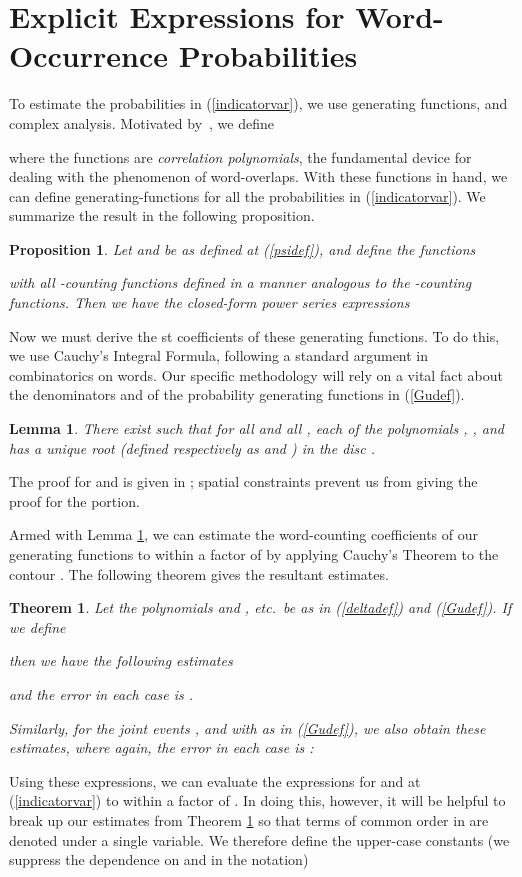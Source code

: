 \documentclass[proceedings]{aofa}
\newtheorem{theorem}{Theorem}
\newtheorem{lemma}{Lemma}
\newtheorem{proposition}{Proposition}
\begin{document}
\section{Explicit Expressions for Word-Occurrence Probabilities}\label{sec:Cauchy}
To estimate the probabilities in (\ref{indicatorvar}), we use
generating functions, 
and complex analysis.
Motivated by~\cite{Bassino:2012}, 
we define

where the functions  are \emph{correlation polynomials},
the fundamental device for dealing with the phenomenon of
word-overlaps. With these functions in hand, we can define
generating-functions 
for all the probabilities in (\ref{indicatorvar}). We summarize the result in the following proposition.
\begin{proposition}
Let  and  be as defined at (\ref{psidef}), and define the functions 

with all -counting functions defined in a manner analogous to the -counting functions. Then we have the closed-form power series expressions

\end{proposition}


Now we must derive the st coefficients of these generating
functions. To do this, we use Cauchy's Integral Formula, following a standard argument in combinatorics on words.  Our specific methodology will rely on a vital fact about the denominators  and  of the probability generating functions in (\ref{Gudef}).

\begin{lemma}\label{uniquerootlemma}
There exist  such that for all  and all , 
each of the polynomials , , and  has a unique root (defined respectively as  and ) in the disc .
\end{lemma}
The proof for  and  is given in \cite{Jacquet:2005}; spatial constraints prevent us from giving the proof for the  portion.

Armed with Lemma \ref{uniquerootlemma}, we can estimate the word-counting coefficients of our generating functions to within a factor of  by applying Cauchy's Theorem to the contour . The following theorem gives the resultant estimates.
\begin{theorem}\label{restheorem}
Let the polynomials  and , etc.\ be as in (\ref{deltadef}) and
(\ref{Gudef}).
If we define

then we have the following estimates

and the error in each case is .

Similarly, for the joint events ,
and 
with  as in (\ref{Gudef}), we also obtain these
estimates, where again, the error in each case is :

\end{theorem}
Using these expressions, we can evaluate the expressions for
 and  at (\ref{indicatorvar}) to within a
factor of . In doing this, however, it will be helpful
to break up our estimates from Theorem \ref{restheorem} so that terms
of common order in  are denoted under a single variable. We
therefore define the upper-case constants (we suppress the dependence
on  and  in the notation)
\end{document}
